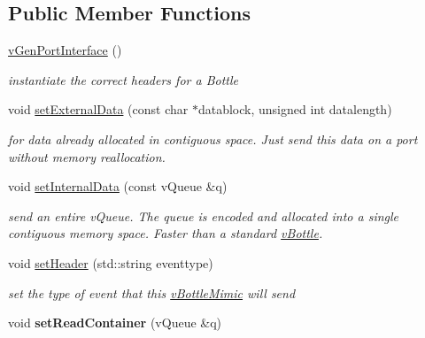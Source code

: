 \subsection*{Public Member Functions}
\begin{DoxyCompactItemize}
\item 
\hyperlink{classev_1_1vGenPortInterface_a502cc1f179d44896d41dd3197e00a231}{v\+Gen\+Port\+Interface} ()\hypertarget{classev_1_1vGenPortInterface_a502cc1f179d44896d41dd3197e00a231}{}\label{classev_1_1vGenPortInterface_a502cc1f179d44896d41dd3197e00a231}

\begin{DoxyCompactList}\small\item\em instantiate the correct headers for a Bottle \end{DoxyCompactList}\item 
void \hyperlink{classev_1_1vGenPortInterface_aae9fb6578cab8a0c349bffbba6688098}{set\+External\+Data} (const char $\ast$datablock, unsigned int datalength)\hypertarget{classev_1_1vGenPortInterface_aae9fb6578cab8a0c349bffbba6688098}{}\label{classev_1_1vGenPortInterface_aae9fb6578cab8a0c349bffbba6688098}

\begin{DoxyCompactList}\small\item\em for data already allocated in contiguous space. Just send this data on a port without memory reallocation. \end{DoxyCompactList}\item 
void \hyperlink{classev_1_1vGenPortInterface_a6327ba2e7d14393b6cf2e090cfa60733}{set\+Internal\+Data} (const v\+Queue \&q)\hypertarget{classev_1_1vGenPortInterface_a6327ba2e7d14393b6cf2e090cfa60733}{}\label{classev_1_1vGenPortInterface_a6327ba2e7d14393b6cf2e090cfa60733}

\begin{DoxyCompactList}\small\item\em send an entire v\+Queue. The queue is encoded and allocated into a single contiguous memory space. Faster than a standard \hyperlink{classev_1_1vBottle}{v\+Bottle}. \end{DoxyCompactList}\item 
void \hyperlink{classev_1_1vGenPortInterface_ab5921d0e859f410dabd029637e9451ac}{set\+Header} (std\+::string eventtype)\hypertarget{classev_1_1vGenPortInterface_ab5921d0e859f410dabd029637e9451ac}{}\label{classev_1_1vGenPortInterface_ab5921d0e859f410dabd029637e9451ac}

\begin{DoxyCompactList}\small\item\em set the type of event that this \hyperlink{classev_1_1vBottleMimic}{v\+Bottle\+Mimic} will send \end{DoxyCompactList}\item 
void {\bfseries set\+Read\+Container} (v\+Queue \&q)\hypertarget{classev_1_1vGenPortInterface_afb52a2ca736fe9e7b840e4834141cd49}{}\label{classev_1_1vGenPortInterface_afb52a2ca736fe9e7b840e4834141cd49}


\end{DoxyCompactItemize}
